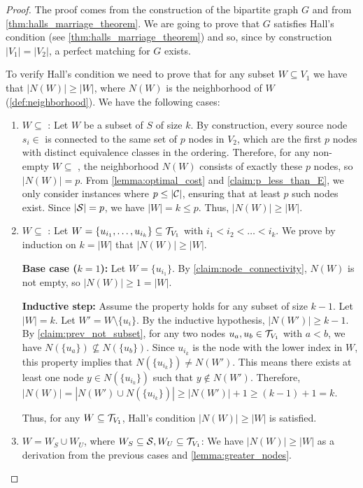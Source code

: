 \begin{proof}
    The proof comes from the construction of the bipartite graph $G$ and from \cref{thm:halls_marriage_theorem}. We are going to prove that $G$ satisfies Hall's condition (see \cref{thm:halls_marriage_theorem}) and so, since by construction $|V_1| = |V_2|$, a perfect matching for $G$ exists.

    To verify Hall's condition we need to prove that for any subset $W \subseteq V_1$ we have that $|N(W)| \geq |W|$, where $N(W)$ is the neighborhood of $W$ (\cref{def:neighborhood}). We have the following cases:
    \begin{enumerate}
        \item $W \subseteq$ \sourceset: Let $W$ be a subset of $S$ of size $k$. By construction, every source node $s_i \in$ \sourceset is connected to the same set of $p$ nodes in $V_2$, which are the first $p$ nodes with distinct equivalence classes in the ordering. Therefore, for any non-empty $W \subseteq$ \sourceset, the neighborhood $N(W)$ consists of exactly these $p$ nodes, so $|N(W)| = p$. From \cref{lemma:optimal_cost} and \cref{claim:p_less_than_E}, we only consider instances where $p \leq |\mathcal{C}|$, ensuring that at least $p$ such nodes exist. Since $|\mathcal{S}|=p$, we have $|W| = k \leq p$. Thus, $|N(W)| \geq |W|$.
        
        \item $W \subseteq$ : Let $W = \{u_{i_1}, \dots, u_{i_k}\} \subseteq \mathcal{T}_{V_1}$ with $i_1 < i_2 < \dots < i_k$. We prove by induction on $k = |W|$ that $|N(W)| \geq |W|$.
        
        \textbf{Base case ($k=1$):} Let $W = \{u_{i_1}\}$. By \cref{claim:node_connectivity}, $N(W)$ is not empty, so $|N(W)| \geq 1 = |W|$.
        
        \textbf{Inductive step:} Assume the property holds for any subset of size $k-1$. Let $|W|=k$. Let $W' = W \setminus \{u_{i}\}$. By the inductive hypothesis, $|N(W')| \geq k-1$. By \cref{claim:prev_not_subset}, for any two nodes $u_a, u_b \in \mathcal{T}_{V_1}$ with $a < b$, we have $N(\{u_a\}) \not\subseteq N(\{u_b\})$. Since $u_{i_k}$ is the node with the lower index in $W$, this property implies that $N(\{u_{i_k}\}) \neq N(W')$. This means there exists at least one node $y \in N(\{u_{i_k}\})$ such that $y \notin N(W')$. Therefore, $|N(W)| = |N(W') \cup N(\{u_{i_k}\})| \geq |N(W')| + 1 \geq (k-1) + 1 = k$.

        Thus, for any $W \subseteq \mathcal{T}_{V_1}$, Hall's condition $|N(W)| \geq |W|$ is satisfied.
        
        \item $W=W_S \cup W_U$, where $W_S \subseteq \mathcal{S}, W_U \subseteq \mathcal{T}_{V_1}$: We have $|N(W)| \geq |W|$ as a derivation from the previous cases and \cref{lemma:greater_nodes}.
    \end{enumerate}
\end{proof}

